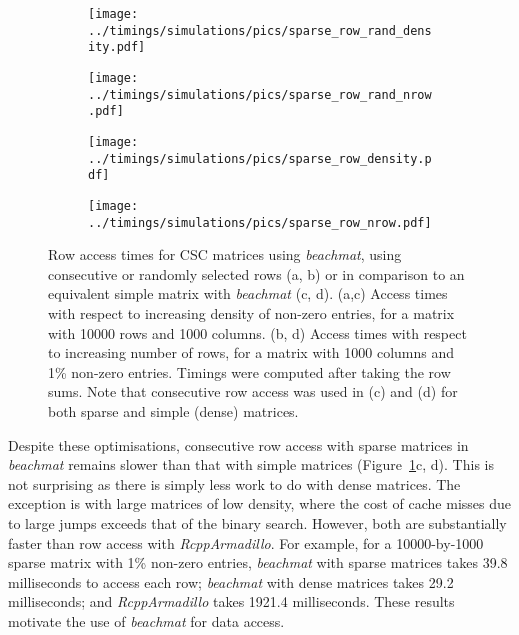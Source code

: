 \documentclass[10pt,letterpaper]{article}
\newcommand{\beachmat}{\textit{beachmat}}
\begin{document}
\begin{figure}[bt]
    \begin{subfigure}[b]{0.49\textwidth}
        \texttt{[image: ../timings/simulations/pics/sparse\_row\_rand\_density.pdf]}
        \caption{}
    \end{subfigure}
    \begin{subfigure}[b]{0.49\textwidth}
        \texttt{[image: ../timings/simulations/pics/sparse\_row\_rand\_nrow.pdf]}
        \caption{}
    \end{subfigure}
    \begin{subfigure}[b]{0.49\textwidth}
        \texttt{[image: ../timings/simulations/pics/sparse\_row\_density.pdf]}
        \caption{}
    \end{subfigure}
    \begin{subfigure}[b]{0.49\textwidth}
        \texttt{[image: ../timings/simulations/pics/sparse\_row\_nrow.pdf]}
        \caption{}
    \end{subfigure}
    \caption{Row access times for CSC matrices using \beachmat{}, using consecutive or randomly selected rows (a, b) or in comparison to an equivalent simple matrix with \beachmat{} (c, d).
        (a,c) Access times with respect to increasing density of non-zero entries, for a matrix with 10000 rows and 1000 columns.
        (b, d) Access times with respect to increasing number of rows, for a matrix with 1000 columns and 1\% non-zero entries.
        Timings were computed after taking the row sums.
        Note that consecutive row access was used in (c) and (d) for both sparse and simple (dense) matrices.
    }
    \label{fig:sparserow}
\end{figure}


Despite these optimisations, consecutive row access with sparse matrices in \beachmat{} remains slower than that with simple matrices (Figure~\ref{fig:sparserow}c, d).
This is not surprising as there is simply less work to do with dense matrices.
The exception is with large matrices of low density, where the cost of cache misses due to large jumps exceeds that of the binary search.
However, both are substantially faster than row access with \textit{RcppArmadillo}.
For example, for a 10000-by-1000 sparse matrix with 1\% non-zero entries, \beachmat{} with sparse matrices takes 39.8 milliseconds to access each row; \beachmat{} with dense matrices takes 29.2 milliseconds; and \textit{RcppArmadillo} takes 1921.4 milliseconds.
These results motivate the use of \beachmat{} for data access.

{\small
    
    
}
\end{document}
